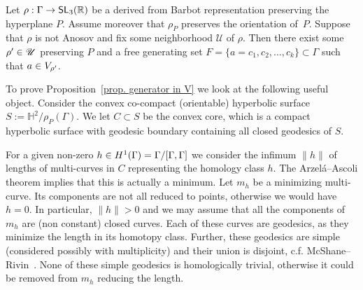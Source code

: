 \documentclass[AHL,Unicode,longabstracts]{cedram}
\DeclareMathOperator{\SL}{\mathsf{SL}}
\newcommand{\R}{\mathbb{R}}
\newcommand{\RR}{\R}
\newcommand{\HH}{\mathbb{H}}
\newcommand{\scU}{\mathscr{U}}
\renewcommand*{\to}{\mathchoice{\longrightarrow}{\rightarrow}{\rightarrow}{\rightarrow}}
\let\oldin\in
\renewcommand{\in}{\mathchoice{\oldin}{\oldin}{\,\oldin\,}{\,\oldin\,}}
\newcommand{\RR}{\mathbb{R}}
\begin{document}
\begin{prop}\label{prop. generator in V}
Let $\rho: \Gamma \to \SL_3(\RR)$ be a derived from Barbot representation preserving the hyperplane $P$. Assume moreover that $\rho_P$ preserves the orientation of~$P$. Suppose that $\rho$ is not Anosov and fix some neighborhood $\scU$ of $\rho$. Then there exist some $\rho'\in\scU$ preserving $P$ and a free generating set $F=\{a=c_1,c_2,\dots,c_k\}\subset \Gamma$ such that $a\in V_{\rho'}$.
\end{prop}



To prove Proposition~\ref{prop. generator in V} we look at the following useful object. Consider the convex co-compact (orientable) hyperbolic surface $S:=\HH^2/\rho_P(\Gamma)$. We let $C\subset S$ be the convex core, which is a compact hyperbolic surface with geodesic boundary containing all closed geodesics of $S$.

For a given non-zero $h\in H^1(\Gamma)=\Gamma/[\Gamma,\Gamma]$ we consider the infimum $\| h\|$ of lengths of multi-curves in $C$ representing the homology class $h$. The Arzelá--Ascoli theorem implies that this is actually a minimum. Let $m_h$ be a minimizing multi-curve. Its components are not all reduced to points, otherwise we would have $h= 0$. In particular, $\| h \| >0$ and we may assume that all the components of $m_h$ are (non constant) closed curves. Each of these curves are geodesics, as they minimize the length in its homotopy class. Further, these geodesics are simple (considered possibly with multiplicity) and their union is disjoint, c.f. McShane--Rivin~\cite[Theorem~4.1]{mcshane-rivin}. None of these simple geodesics is homologically trivial, otherwise it could be removed from $m_h$ reducing the length.
\end{document}
